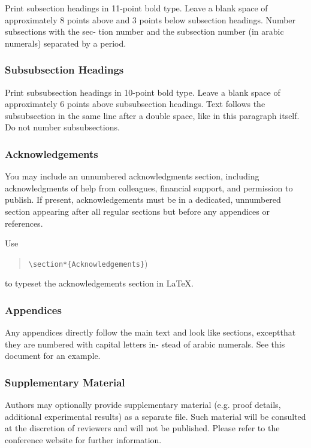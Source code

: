 \documentclass{article}
\begin{document}
Print subsection headings in 11-point bold type. Leave a blank space of
approximately 8 points above and 3 points below subsection headings. Number
subsections with the sec- tion number and the subsection number (in arabic
numerals) separated by a period.

\subsubsection{Subsubsection Headings}

Print subsubsection headings in 10-point bold type. Leave a blank space of
approximately 6 points above subsubsection headings. Text follows the
subsubsection in the same line after a double space, like in this paragraph
itself. Do not number subsubsections.

\subsubsection{Acknowledgements}

You may include an unnumbered acknowledgments section, including
acknowledgments of help from colleagues, financial support, and permission to
publish. If present, acknowledgements must be in a dedicated, unnumbered
section appearing after all regular sections but before any appendices or
references.

Use
\begin{quote}
  \texttt{\textbackslash{}section*\{Acknowledgements\}})
\end{quote}
to typeset the acknowledgements section in \LaTeX{}.

\subsubsection{Appendices}
Any appendices directly follow the  main text and look like sections, exceptthat they are numbered with capital letters in-
stead of arabic numerals. See this document for an example.

\subsubsection{Supplementary Material}
Authors may optionally provide supplementary material (e.g. proof details, additional experimental results)
as a separate file. Such material will be consulted at the discretion of reviewers and will not be published.
Please refer to the conference website for further information.
\end{document}

